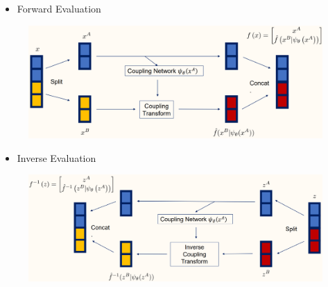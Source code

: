 \begin{definition}
    \begin{itemize}
        \item Forward Evaluation
    \end{itemize}

    \begin{figure}[H]
        \centering
        \includegraphics[width=1.0\textwidth]{.././assets/10.12.png}
    \end{figure}

    \begin{itemize}
        \item Inverse Evaluation
    \end{itemize}

    \begin{figure}[H]
        \centering
        \includegraphics[width=1.0\textwidth]{.././assets/10.13.png}
    \end{figure}
\end{definition}


